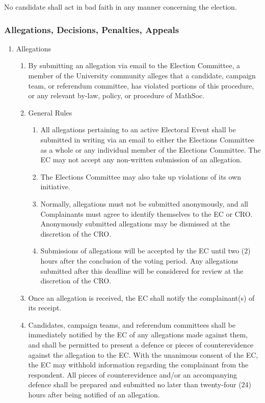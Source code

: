 No candidate shall act in bad faith in any manner concerning the election.
\subsubsection{Allegations, Decisions, Penalties, Appeals}
\begin{enumerate}
	\item Allegations
		\begin{enumerate}
			\item By submitting an allegation via email to the Election Committee, a member of the University community alleges that a candidate, campaign team, or referendum committee, has violated portions of this procedure, or any relevant by-law, policy, or procedure of MathSoc.
			\item General Rules 
				\begin{enumerate}
					\item All allegations pertaining to an active Electoral Event shall be submitted in writing via an email to either the Elections Committee as a whole or any individual member of the Elections Committee. The EC may not accept any non-written submission of an allegation.
					\item The Elections Committee may also take up violations of its own initiative.
					\item Normally, allegations must not be submitted anonymously, and all Complainants must agree to identify themselves to the EC or CRO. Anonymously submitted allegations may be dismissed at the discretion of the CRO.
					\item Submissions of allegations will be accepted by the EC until two (2) hours after the conclusion of the voting period. Any allegations submitted after this deadline will be considered for review at the discretion of the CRO.
				\end{enumerate}
			\item Once an allegation is received, the EC shall notify the complainant(s) of its receipt.
			\item Candidates, campaign teams, and referendum committees shall be immediately notified by the EC of any allegations made against them, and shall be permitted to present a defence or pieces of counterevidence against the allegation to the EC. With the unanimous consent of the EC, the EC may withhold information regarding the complainant from the respondent. All pieces of counterevidence and/or an accompanying defence shall be prepared and submitted no later than twenty-four (24) hours after being notified of an allegation.

\end{enumerate}
\end{enumerate}
